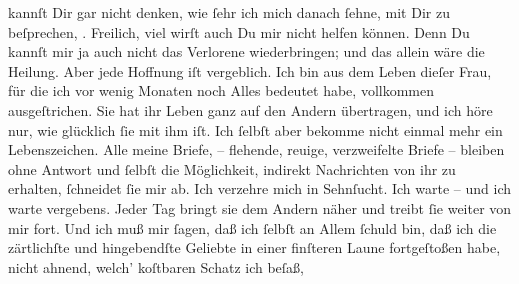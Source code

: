 \begin{ledgroupsized}[t]{13cm}
               kannſt Dir gar nicht denken, wie ſehr ich mich danach ſehne, mit Dir zu beſprechen,
                  \label{K_L03363-3v}\label{K_L03363-3h}.
               Freilich, viel wirſt auch Du mir nicht helfen können. {\pb}Denn Du kannſt mir ja auch nicht das Verlorene
               wiederbringen; und das allein wäre die Heilung. Aber jede Hoffnung iſt vergeblich.
               Ich bin aus dem Leben dieſer Frau,  für die ich vor wenig Monaten
               noch Alles bedeutet habe, vollkommen ausgeſtrichen. Sie hat ihr Leben ganz auf den
                  Andern übertragen, und
               ich höre nur, wie glücklich ſie mit ihm iſt. Ich ſelbſt aber bekomme nicht einmal
               mehr ein Lebenszeichen. Alle meine Briefe, – flehende, reuige, verzweifelte Briefe –
                  {\pb}bleiben ohne Antwort und ſelbſt die Möglichkeit,
               indirekt Nachrichten\strikeout{\textcolor{gray}{×}} von ihr zu erhalten, ſchneidet ſie mir ab. Ich verzehre mich in Sehnſucht. Ich warte – und
               ich warte vergebens. Jeder Tag bringt sie dem Andern näher und treibt ſie weiter von mir fort. Und ich
               muß mir ſagen, daß ich ſelbſt an Allem ſchuld \introOben{}bin\introOben{}, daß ich
               die zärtlichſte und hingebendſte Geliebte in einer finſteren Laune fortgeſtoßen habe,
               nicht ahnend, {\pb}welch’ koſtbaren Schatz ich beſaß,

\end{ledgroupsized}
